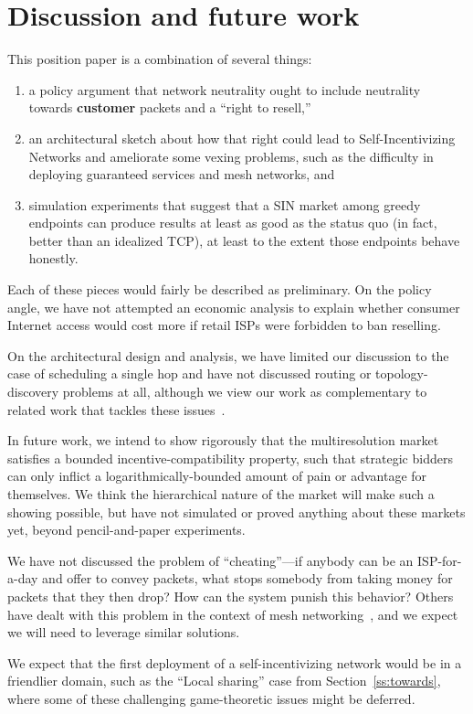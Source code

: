 \section{Discussion and future work}
\label{sec:limits}

This position paper is a combination of several things:

\begin{enumerate}

\item a policy
argument that network neutrality ought to include neutrality towards
\textbf{customer} packets and a ``right to resell,''

\item an
architectural sketch about how that right could lead to 
Self-Incentivizing Networks and ameliorate some vexing problems, such
as the difficulty in deploying guaranteed services and mesh networks,
and

\item simulation experiments that suggest that a SIN market among
greedy endpoints can produce results at least as good as the status
quo (in fact, better than an idealized TCP), at least to the extent
those endpoints behave honestly.

\end{enumerate}

Each of these pieces would fairly be described as preliminary. On the
policy angle, we have not attempted an economic analysis to explain
whether consumer Internet access would cost more if retail ISPs were
forbidden to ban reselling.

On the architectural design and analysis, we have limited our
discussion to the case of scheduling a single hop and have not
discussed routing or topology-discovery problems at all, although we
view our work as complementary to related work that tackles these
issues~\cite{routebazaar15, esquivel09}.

In future work, we intend to show rigorously that the multiresolution
market satisfies a bounded incentive-compatibility
property, such that strategic bidders can only inflict a
logarithmically-bounded amount of pain or advantage for themselves. We
think the hierarchical nature of the market will make such a showing
possible, but have not simulated or proved anything about these
markets yet, beyond pencil-and-paper experiments.

We have not discussed the problem of ``cheating''---if anybody can be
an ISP-for-a-day and offer to convey packets, what stops somebody from
taking money for packets that they then drop? How can the system
punish this behavior? Others have dealt with this problem in the
context of mesh networking~\cite{onions14, torpath14, kadupul15}, and
we expect we will need to leverage similar solutions.

We expect that the first deployment of a self-incentivizing network
would be in a friendlier domain, such as the ``Local
sharing'' case from Section~\ref{ss:towards}, where some of these
challenging game-theoretic issues might be deferred.
